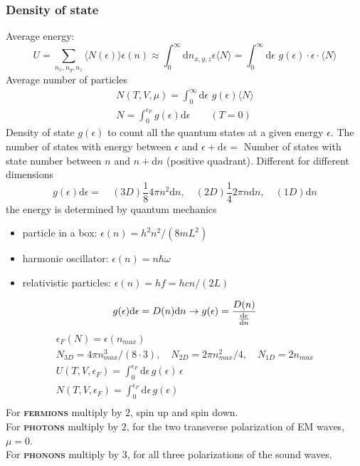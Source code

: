 \documentclass[a4paper, norsk, 8pt]{article}
\begin{document}
\begin{multicols*}{3}
\subsubsection*{\scriptsize  Density of state}
Average energy:
\begin{equation*}
  U = \sum_{n_x,n_y,n_z} \langle N(\epsilon) \rangle \epsilon(n) \approx \int_0^{\infty}\mbox{d}n_{x,y,z}\epsilon \langle N \rangle = \int_{0}^{\infty}\mbox{d}\epsilon\,\, g(\epsilon)\cdot \epsilon \cdot \langle N \rangle
\end{equation*}
Average number of particles
\begin{gather*}
  N(T,V,\mu) = \int_0^{\infty} \mbox{d}\epsilon\,\, g(\epsilon) \langle N \rangle \\
  N = \int_0^{\epsilon_F} g(\epsilon) \mbox{d}\epsilon \qquad (T=0)
\end{gather*}
Density of state $g(\epsilon)$ to count all the quantum states at a given energy $\epsilon$. The number of states with energy between $\epsilon$ and $\epsilon + \mbox{d}\epsilon = $ Number of states with state number between $n$ and $n+\mbox{d}n$ (positive quadrant). Different for different dimensions
\begin{equation*}
  \boxed{g(\epsilon) \mbox{d}\epsilon=} \quad(3D) \frac{1}{8}4\pi n^2 \mbox{d}n, \quad(2D) \frac{1}{4}2\pi n \mbox{d}n, \quad(1D)\mbox{d}n
\end{equation*}
the energy is determined by quantum mechanics
\begin{itemize}
  \item particle in a box: $\epsilon(n) = h^2n^2/(8mL^2)$
  \item harmonic oscillator: $\epsilon(n) = n\hbar\omega$
  \item relativistic particles: $\epsilon(n) = hf = hcn/(2L)$
\end{itemize}
\begin{equation*}
    g(\epsilon)\mbox{d}\epsilon = D(n)\mbox{d}n \rightarrow g(\epsilon) = \frac{D(n)}{\dv{\epsilon}{n}}
\end{equation*}
\begin{gather*}
  \epsilon_F(N) = \epsilon(n_{max}) \\
  N_{3D} = 4\pi n_{max}^3/(8\cdot 3), \quad N_{2D} = 2\pi n_{max}^2/4, \quad N_{1D} = 2n_{max}\\
  U(T,V,\epsilon_F) = \int_0^{\epsilon_F} \mbox{d}\epsilon \, g(\epsilon)\, \epsilon \\
  N(T,V,\epsilon_F) = \int_0^{\epsilon_F} \mbox{d}\epsilon \, g(\epsilon) \\
\end{gather*}
For \textbf{\textsc{fermions}} multiply by $2$, spin up and spin down.\\
For \textbf{\textsc{photons}} multiply by $2$, for the two transverse polarization of EM waves, $\mu=0$.\\
For \textbf{\textsc{phonons}} multiply by $3$, for all three polarizations of the sound waves.



\end{multicols*}
\end{document}
